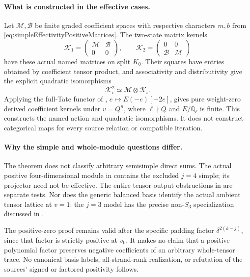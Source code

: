 \paragraph{What is constructed in the effective cases.}
Let \(\mathcal M,\mathcal B\) be finite graded coefficient
spaces with respective characters \(m,b\) from
\eqref{eq:simpleEffectivityPositiveMatrices}. The two-state
matrix kernels
\[
 \mathcal K_1=
 \begin{pmatrix}\mathcal M&\mathcal B\\0&0\end{pmatrix},
 \qquad
 \mathcal K_2=
 \begin{pmatrix}0&0\\\mathcal B&\mathcal M\end{pmatrix}
\]
have these actual named matrices on split \(K_0\).
Their squares have entries obtained by coefficient
tensor product, and associativity and distributivity
give the explicit quadratic isomorphisms
\[
              \mathcal K_i^2\simeq\mathcal M\otimes\mathcal K_i.
\]
Applying the full-Tate functor of ,
\(e\mapsto E(-e)[-2e]\), gives pure weight-zero
derived coefficient kernels under \(v=Q^n\), where
\(\ell\nmid Q\) and \(E/\mathbb Q_\ell\) is finite.
This constructs the named action and quadratic
isomorphisms. It does not construct categorical maps
for every source relation or compatible iteration.

\paragraph{Why the simple and whole-module questions differ.}
The theorem does not classify arbitrary semisimple
direct sums. The actual positive four-dimensional
module in  contains the excluded \(j=4\)
simple; its projector need not be effective.
The entire tensor-output obstructions in 
are separate tests. Nor does the generic balanced
basis identify the actual ambient tensor lattice
at \(v=1\): the \(j=3\) model has the precise
non-\(S_3\) specialization discussed in .

The positive-zero proof remains valid after the
specific padding factor \(\delta^{2(k-j)}\), since
that factor is strictly positive at \(v_0\).
It makes no claim that a positive polynomial factor
preserves negative coefficients of an arbitrary
whole-tensor trace. No canonical basis labels,
all-strand-rank realization, or refutation of the
sources' signed or factored positivity follows.

